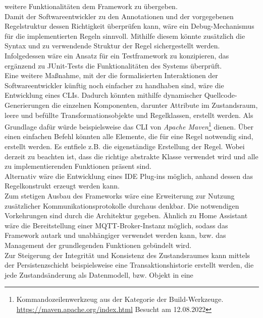     weitere Funktionalitäten dem Framework zu übergeben. 
    \\
    Damit der Softwareentwickler zu den Annotationen und der vorgegebenen Regelstruktur dessen Richtigkeit überprüfen kann, wäre ein Debug-Mechanismus für die implementierten Regeln sinnvoll. 
    Mithilfe diesem könnte zusätzlich die Syntax und zu verwendende Struktur der Regel sichergestellt werden. Infolgedessen wäre ein Ansatz für ein Testframework zu konzipieren, das 
    ergänzend zu JUnit-Tests die Funktionalitäten des Systems überprüft. 
    \\
    \linebreak
    Eine weitere Maßnahme, mit der die formalisierten Interaktionen der Softwareentwickler künftig noch einfacher zu handhaben sind, wäre die Entwicklung eines \ac{CLI}s. Dadurch könnten mithilfe 
    dynamischer Quellcode-Generierungen die einzelnen Komponenten, darunter Attribute im Zustandsraum, leere und befüllte Transformationsobjekte und Regelklassen, erstellt werden. Als Grundlage dafür 
    würde beispielsweise das \acs{CLI} von \textit{Apache Maven}\footnote{Kommandozeilenwerkzeug aus der Kategorie der Build-Werkzeuge. \url{https://maven.apache.org/index.html} Besucht am 12.08.2022} 
    dienen. Über einen einfachen Befehl könnten alle Elemente, die für eine Regel notwendig sind, erstellt werden. Es entfiele z.B. die 
    eigenständige Erstellung der Regel. Wobei derzeit zu beachten ist, dass die richtige abstrakte Klasse verwendet wird und alle zu implementierenden Funktionen präsent sind. 
    \\
    Alternativ wäre die Entwicklung eines \ac{IDE} Plug-ins möglich, anhand dessen das Regelkonstrukt erzeugt werden kann. 
    \\
    \linebreak
    Zum stetigen Ausbau des Frameworks wäre eine Erweiterung zur Nutzung zusätzlicher Kommunikationsprotokolle durchaus denkbar. Die notwendigen Vorkehrungen sind durch die Architektur gegeben. 
    Ähnlich zu Home Assistant wäre die Bereitstellung einer \acs{MQTT}-Broker-Instanz möglich, sodass das Framework autark und unabhängiger verwendet werden kann, bzw. das Management der grundlegenden Funktionen 
    gebündelt wird. 
    \\
    \linebreak
    Zur Steigerung der Integrität und Konsistenz des Zustandsraumes kann mittels der Persistenzschicht beispielsweise eine Transaktionshistorie erstellt werden, die jede Zustandsänderung als Datenmodell, bzw. Objekt in eine 

